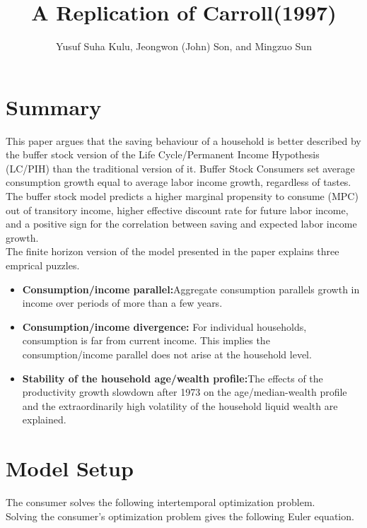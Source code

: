 \documentclass[]{article}
\title{A Replication of Carroll(1997)}
\author{Yusuf Suha Kulu, Jeongwon (John) Son, and Mingzuo Sun}
\date{}
\providecommand{\EqDir}{Equations}
\begin{document}
\setlength\parindent{0pt}

\maketitle

\section{Summary}

This paper argues that the saving behaviour of a household is better described by the buffer stock version of the Life Cycle/Permanent Income Hypothesis (LC/PIH) than the traditional version of it. Buffer Stock Consumers set average consumption growth equal to average labor income growth, regardless of tastes. The buffer stock model predicts a higher marginal propensity to consume (MPC) out of transitory income, higher effective discount rate for future labor income, and a positive sign for the correlation between saving and expected labor income growth.\\

The finite horizon version of the model presented in the paper explains three emprical puzzles.
\begin{itemize}
\item \textbf{Consumption/income parallel:}Aggregate consumption parallels growth in income over periods of more than a few years.
\item \textbf{Consumption/income divergence:} For individual households, consumption is far from current income. This implies the consumption/income parallel does not arise at the household level.
\item \textbf{Stability of the household age/wealth profile:}The effects of the productivity growth slowdown after 1973 on the age/median-wealth profile and the extraordinarily high volatility of the household liquid wealth are explained. 
\end{itemize}

\newpage 

\section{Model Setup}

The consumer solves the following intertemporal optimization problem.\\


Solving the consumer's optimization problem gives the following Euler equation.\\

\end{document}
